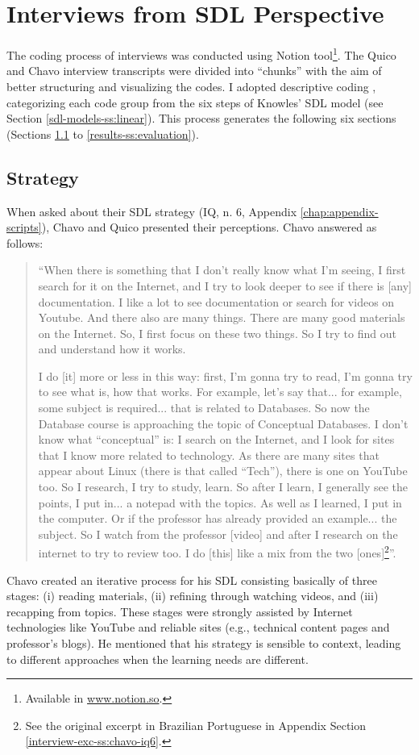 \section{Interviews from SDL Perspective}
\label{res-sec:interviews}

The coding process of interviews was conducted using Notion tool\footnote{Available in \url{www.notion.so}.}. The Quico and Chavo interview transcripts were divided into ``chunks'' with the aim of better structuring and visualizing the codes. I adopted descriptive coding \cite[p.~4]{saldana:2013}, categorizing each code group from the six steps of Knowles' \gls{SDL} model (see Section \ref{sdl-models-ss:linear}). This process generates the following six sections (Sections \ref{results-ss:strategy} to \ref{results-ss:evaluation}). 

\subsection{Strategy}
\label{results-ss:strategy}

When asked about their \gls{SDL} strategy (\gls{IQ}, n. 6, Appendix \ref{chap:appendix-scripts}), Chavo and Quico presented their perceptions. Chavo answered as follows: 
\begin{quote}
    “When there is something that I don't really know what I'm seeing, I first search for it on the Internet, and I try to look deeper to see if there is [any] documentation. I like a lot to see documentation or search for videos on Youtube. And there also are many things. There are many good materials on the Internet. So, I first focus on these two things. So I try to find out and understand how it works. 
    
    I do [it] more or less in this way: first, I'm gonna try to read, I'm gonna try to see what is, how that works. For example, let's say that... for example, some subject is required... that is related to Databases. So now the Database course is approaching the topic of Conceptual Databases. I don't know what ``conceptual'' is: I search on the Internet, and I look for sites that I know more related to technology. As there are many sites that appear about Linux (there is that called ``Tech''), there is one on YouTube too. So I research, I try to study, learn. So after I learn, I generally see the points, I put in... a notepad with the topics. As well as I learned, I put in the computer. Or if the professor has already provided an example... the subject. So I watch from the professor [video] and after I research on the internet to try to review too. I do [this] like a mix from the two [ones]\footnote{See the original excerpt in Brazilian Portuguese in Appendix Section \ref{interview-exc-ss:chavo-iq6}.}”.
\end{quote}
Chavo created an iterative process for his \gls{SDL} consisting basically of three stages: (i) reading materials, (ii) refining through watching videos, and (iii) recapping from topics. These stages were strongly assisted by Internet technologies like YouTube and reliable sites (e.g., technical content pages and professor’s blogs). He mentioned that his strategy is sensible to context, leading to different approaches when the learning needs are different. 


